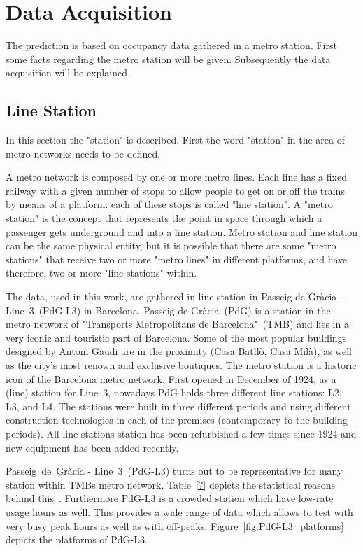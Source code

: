 \section{Data Acquisition}
\label{sec:dataAcquisition}

The prediction is based on occupancy data gathered in a metro station. First some facts regarding the metro station will be given. Subsequently the data acquisition will be explained.

\subsection{Line Station}
\label{subsec:lineStation}

In this section the "station" is described. First the word "station" in the area of metro networks needs to be defined.

A metro network is composed by one or more metro lines. Each line has a fixed railway with a given number of stops to allow people to get on or off the trains by means of a platform: each of these stops is called "line station". A "metro station" is the concept that represents the point in space through which a passenger gets underground and into a line station. Metro station and line station can be the same physical entity, but it is possible that there are some "metro stations" that receive two or more "metro lines" in different platforms, and have therefore, two or more "line stations" within.

The data, used in this work, are gathered in line station in Passeig de Gr\`{a}cia - Line~3~(PdG-L3) in Barcelona. Passeig de Gr\`{a}cia~(PdG) is a station in the metro network of "Transports Metropolitans de Barcelona"~(TMB) and lies in a very iconic and touristic part of Barcelona. Some of the most popular buildings designed by Antoni Gaudi are in the proximity (Casa Batll\`{o}, Casa Mil\`{a}), as well as the city's most renown and exclusive boutiques.
The metro station is a historic icon of the Barcelona metro network. First opened in December of 1924, as a (line) station for Line~3, nowadays PdG holds three different line stations: L2, L3, and L4. The stations were built in three different periods and using different construction technologies in each of the premises (contemporary to the building periods). All line stations station has been refurbished a few times since 1924 and new equipment has been added recently.

Passeig~de~Gr\`{a}cia - Line~3~(PdG-L3) turns out to be representative for many station within TMBs metro network. Table~\ref{?} depicts the statistical reasons behind this~\cite{TMB}. Furthermore PdG-L3 is a crowded station which have low-rate usage hours as well. This provides a wide range of data which allows to test with very busy peak hours as well as with off-peaks. Figure~\ref{fig:PdG-L3_platforms} depicts the platforms of PdG-L3.

